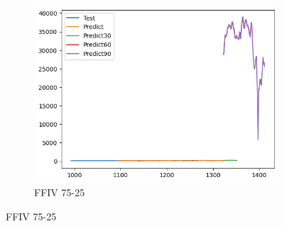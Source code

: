 \documentclass{ieeeojies}
\begin{document}
\begin{figure}[H]
\begin{subfigure}[b]{0.33\linewidth}
        \includegraphics[width=\linewidth]{AddRNN Plot/AddRNN_FFIV_75_25.png}
        \caption{FFIV 75-25}
        \label{fig:ffiv-75-25}
    \end{subfigure}
\end{figure}
\end{document}
